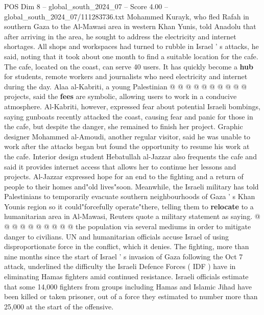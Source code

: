 \begin{textsample}{POS Dim 8 – global\_south\_2024\_07 – Score 4.00 – global\_south\_2024\_07/111283736.txt}
Mohammed Kurayk, who fled Rafah in southern Gaza to the Al-Mawasi area in western Khan Yunis, told Anadolu that after arriving in the area, he sought to address the electricity and internet shortages.
All shops and workspaces had turned to rubble in Israel ' s attacks, he said, noting that it took about one month to find a suitable location for the cafe.
The cafe, located on the coast, can serve 40 users.
It has quickly become a \textbf{hub} for students, remote workers and journalists who need electricity and internet during the day.
Alaa al-Kabriti, a young Palestinian @ @ @ @ @ @ @ @ @ @ projects, said the \textbf{fees} are symbolic, allowing users to work in a conducive atmosphere.
Al-Kabriti, however, expressed fear about potential Israeli bombings, saying gunboats recently attacked the coast, causing fear and panic for those in the cafe, but despite the danger, she remained to finish her project.
Graphic designer Mohammed al-Amoudi, another regular visitor, said he was unable to work after the attacks began but found the opportunity to resume his work at the cafe.
Interior design student Hebatullah al-Jazzar also frequents the cafe and said it provides internet access that allows her to continue her lessons and projects.
Al-Jazzar expressed hope for an end to the fighting and a return of people to their homes and"old lives"soon.
Meanwhile, the Israeli military has told Palestinians to temporarily evacuate southern neighbourhoods of Gaza ' s Khan Younis region so it could"forcefully operate"there, telling them to \textbf{relocate} to a humanitarian area in Al-Mawasi, Reuters quote a military statement as saying. @ @ @ @ @ @ @ @ @ @ the population via several mediums in order to mitigate danger to civilians.
UN and humanitarian officials accuse Israel of using disproportionate force in the conflict, which it denies.
The fighting, more than nine months since the start of Israel ' s invasion of Gaza following the Oct 7 attack, underlined the difficulty the Israeli Defence Forces ( IDF ) have in eliminating Hamas fighters amid continued resistance.
Israeli officials estimate that some 14,000 fighters from groups including Hamas and Islamic Jihad have been killed or taken prisoner, out of a force they estimated to number more than 25,000 at the start of the offensive.

\end{textsample}
